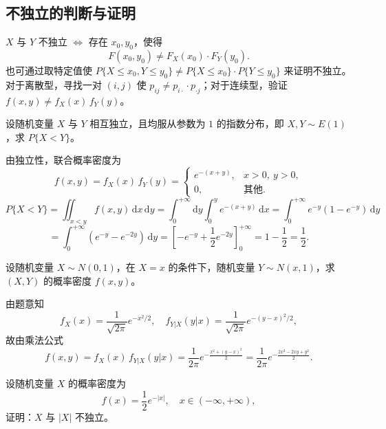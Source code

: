 \documentclass[lang=cn,11pt]{elegantbook}
\begin{document}
\subsection{不独立的判断与证明}

\begin{property}[不独立的判定]\label{prop:dependence-criterion}
$X$ 与 $Y$ 不独立 $\iff$ 存在 $x_0, y_0$，使得
\[
F(x_0, y_0) \neq F_X(x_0) \cdot F_Y(y_0).
\]
也可通过取特定值使 $P\{X \leqslant x_0, Y \leqslant y_0\} \neq P\{X \leqslant x_0\} \cdot P\{Y \leqslant y_0\}$ 来证明不独立。对于离散型，寻找一对 $(i,j)$ 使 $p_{ij} \neq p_{i\cdot} \cdot p_{\cdot j}$；对于连续型，验证 $f(x,y) \neq f_X(x)\,f_Y(y)$。
\end{property}

\begin{exercise}\label{exer:3-5}
设随机变量 $X$ 与 $Y$ 相互独立，且均服从参数为 $1$ 的指数分布，即 $X, Y \sim E(1)$，求 $P\{X < Y\}$。
\end{exercise}

\begin{solution}
由独立性，联合概率密度为
\[
f(x,y) = f_X(x)\,f_Y(y) = \begin{cases} e^{-(x+y)}, & x > 0,\ y > 0, \\ 0, & \text{其他}. \end{cases}
\]
\[
P\{X < Y\} = \iint_{x < y}f(x,y)\,\mathrm{d}x\,\mathrm{d}y = \int_0^{+\infty}\mathrm{d}y\int_0^y e^{-(x+y)}\,\mathrm{d}x = \int_0^{+\infty}e^{-y}(1-e^{-y})\,\mathrm{d}y
\]
\[
= \int_0^{+\infty}(e^{-y} - e^{-2y})\,\mathrm{d}y = \left[-e^{-y} + \frac{1}{2}e^{-2y}\right]_0^{+\infty} = 1 - \frac{1}{2} = \frac{1}{2}.
\]
\end{solution}

\begin{exercise}[条件正态联合密度] \label{exer:3-5b}
设随机变量 $X \sim N(0,1)$，在 $X = x$ 的条件下，随机变量 $Y \sim N(x, 1)$，求 $(X,Y)$ 的概率密度 $f(x,y)$。
\end{exercise}

\begin{solution}
由题意知
\[
f_X(x) = \frac{1}{\sqrt{2\pi}}e^{-x^2/2}, \quad f_{Y|X}(y|x) = \frac{1}{\sqrt{2\pi}}e^{-(y-x)^2/2},
\]
故由乘法公式
\[
f(x,y) = f_X(x)\,f_{Y|X}(y|x) = \frac{1}{2\pi}e^{-\frac{x^2 + (y-x)^2}{2}} = \frac{1}{2\pi}e^{-\frac{2x^2 - 2xy + y^2}{2}}.
\]
\end{solution}

\begin{exercise}[证明 $X$ 与 $|X|$ 不独立] \label{exer:3-5c}
设随机变量 $X$ 的概率密度为
\[
f(x) = \frac{1}{2}e^{-|x|}, \quad x \in (-\infty, +\infty),
\]
证明：$X$ 与 $|X|$ 不独立。
\end{exercise}
\end{document}
